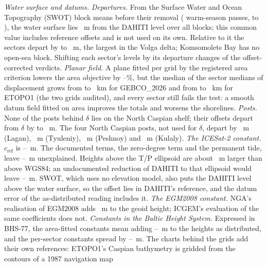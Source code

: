 \emph{Water surface and datums.} \emph{Departures.} From the Surface Water and Ocean Topography (SWOT) block means before their removal ( warm-season passes,  to ), the water surface lies ~m from the DAHITI level over all blocks; this common value includes reference offsets and is not used on its own. Relative to it the sectors depart by  to ~m, the largest in the Volga delta; Komsomolets Bay has no open-sea block. Shifting each sector's levels by its departure changes  of the  offset-corrected verdicts. \emph{Planar field.} A plane fitted per grid by the registered area criterion lowers the area objective by --\%, but the median of the sector medians of displacement grows from  to ~km for GEBCO\_2026 and from  to ~km for ETOPO1 (the two grids audited), and every sector still fails the test: a smooth datum field fitted on area improves the totals and worsens the shorelines. \emph{Posts.} None of the  posts behind $\delta$ lies on the North Caspian shelf; their offsets depart from $\delta$ by  to ~m. The four North Caspian posts, not used for $\delta$, depart by ~m (Lagan), ~m (Tyuleniy), ~m (Peshnoy) and ~m (Kulaly). \emph{The ICESat-2 constant.} $c_\mathrm{ref}$ is --~m. The documented terms, the zero-degree term\citep{iers_tn36} and the permanent tide, leave --~m unexplained. Heights above the T/P ellipsoid are about ~m larger than above WGS84\citep{is2_compguide_r007}; an undocumented reduction of DAHITI to that ellipsoid would leave --~m. SWOT, which uses no elevation model, also puts the DAHITI level above the water surface, so the offset lies in DAHITI's reference, and the datum error of the as-distributed reading includes it. \emph{The EGM2008 constant.} NGA's realisation of EGM2008 adds ~m to the geoid height\citep{geographiclib_gravity}; ICGEM's evaluation of the same coefficients does not\citep{icgem_faq}. \emph{Constants in the Baltic Height System.} Expressed in BHS-77, the area-fitted constants mean adding --~m to the heights as distributed, and the per-sector constants spread by --~m. The charts behind the grids add their own references: ETOPO1's Caspian bathymetry is gridded from the contours of a 1987 navigation map 